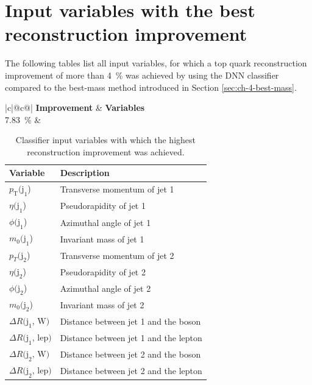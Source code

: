 \chapter{Input variables with the best reconstruction improvement}
The following tables list all input variables, for which a top quark reconstruction improvement of more than \SI{4}{\%} was achieved by using the DNN classifier compared to the best-mass method introduced in Section \ref{sec:ch-4-best-mass}.

\begin{table}[h]
    \centering
    \label{tab:app_vars_1}
    \caption{Classifier input variables with which the highest reconstruction improvement was achieved.}
    \begin{tabular}{ |c|@{}c@{}| }
        \hline
        \textbf{Improvement} & \textbf{Variables}\\
        \hline
        \SI{7.83}{\%} & 
        \begin{tabular}{ll}
            \hline
            Variable & Description\\
            \hline
            $p_\text{T}\text{(j}_\text{1}$) & Transverse momentum of jet 1\\
            $\eta\text{(j}_\text{1}$) & Pseudorapidity of jet 1\\
            $\phi\text{(j}_\text{1}$) & Azimuthal angle of jet 1\\
            $m_0\text{(j}_\text{1}$) & Invariant mass of jet 1\\

            $p_T\text{(j}_\text{2}$) & Transverse momentum of jet 2\\
            $\eta\text{(j}_\text{2}$) & Pseudorapidity of jet 2\\
            $\phi\text{(j}_\text{2}$) & Azimuthal angle of jet 2\\
            $m_0\text{(j}_\text{2}$) & Invariant mass of jet 2\\

            $\Delta R \text{(j}_\text{1}\text{, W)}$ & Distance between jet 1 and the \PW boson\\
            $\Delta R \text{(j}_\text{1}\text{, lep)}$ & Distance between jet 1 and the lepton\\
            $\Delta R \text{(j}_\text{2}\text{, W)}$ & Distance between jet 2 and the \PW boson\\
            $\Delta R \text{(j}_\text{2}\text{, lep)}$ & Distance between jet 2 and the lepton\\
            \hline
        \end{tabular}\\
        \hline
    \end{tabular}
\end{table}


